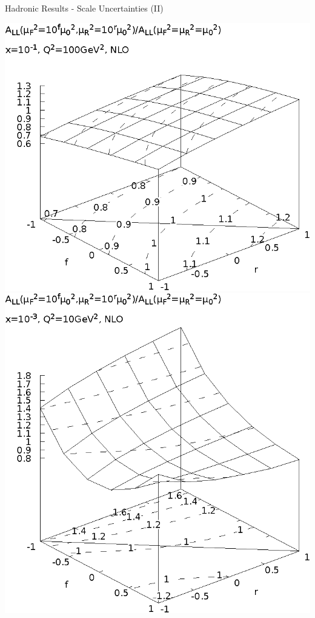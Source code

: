\begin{frame}{Hadronic Results - Scale Uncertainties (II)}
\begin{center}
\includegraphics[width=.48\textwidth]{img/ALL-muF2-muR2-x_1-q2_2}
\includegraphics[width=.48\textwidth]{img/ALL-muF2-muR2-x_3-q2_1}
\end{center}
\end{frame}
